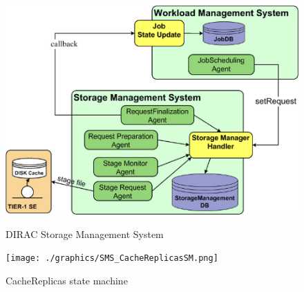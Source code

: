 \documentclass[sort&compress,preprint,3p]{elsarticle}
\begin{document}
\begin{figure}
\centering
\begin{minipage}{.5\textwidth}
  \centering
  \includegraphics[width=0.98\linewidth]{./graphics/Figure4.png}
  \caption{DIRAC Storage Management System}
  \label{fig:DIRAC-SMS}
\end{minipage}%
\begin{minipage}{.5\textwidth}
  \centering
  \texttt{[image: ./graphics/SMS\_CacheReplicasSM.png]}
  \caption{CacheReplicas state machine}
  \label{fig:CacheReplicas-SM}
\end{minipage}
\end{figure}
\end{document}
